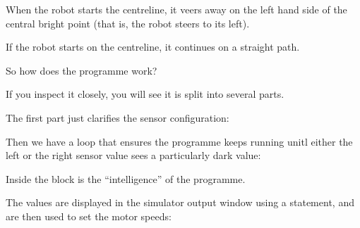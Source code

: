 \documentclass[letterpaper,10pt,english]{sphinxmanual}
\begin{document}
When the robot starts  the centreline, it veers away on the left hand side of the central bright point (that is, the robot steers to its left).

If the robot starts on the centreline, it continues on a straight path.

So how does the programme work?

If you inspect it closely, you will see it is split into several parts.

The first part just clarifies the sensor configuration:

\begin{sphinxVerbatim}[commandchars=\\\{\}]
  
  
\end{sphinxVerbatim}

Then we have a  loop that ensures the programme keeps running unitl either the left or the right sensor value sees a particularly dark value:

\begin{sphinxVerbatim}[commandchars=\\\{\}]
 
        
\end{sphinxVerbatim}

Inside the  block is the “intelligence” of the programme.

The values are displayed in the simulator output window using a  statement, and are then used to set the motor speeds:

\begin{sphinxVerbatim}[commandchars=\\\{\}]
  
  

 
\end{sphinxVerbatim}
\end{document}
